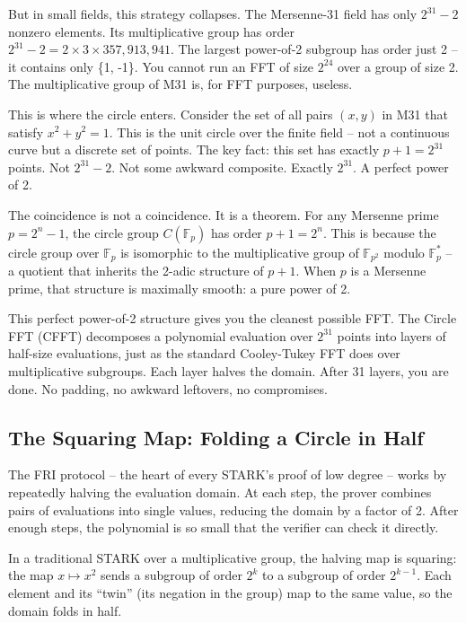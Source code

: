 \documentclass[
  11pt,
  openany]{report}
\begin{document}
But in small fields, this strategy collapses. The Mersenne-31 field has only
\(2^{31} - 2\) nonzero elements. Its multiplicative group has order
\(2^{31} - 2 = 2 \times 3 \times 357{,}913{,}941\). The largest power-of-2
subgroup has order just 2 -- it contains only \{1, -1\}. You cannot run an FFT
of size \(2^{24}\) over a group of size 2. The multiplicative group of M31 is,
for FFT purposes, useless.

This is where the circle enters. Consider the set of all pairs \((x, y)\) in M31
that satisfy \(x^2 + y^2 = 1\). This is the unit circle over the finite field --
not a continuous curve but a discrete set of points. The key fact: this set has
exactly \(p + 1 = 2^{31}\) points. Not \(2^{31} - 2\). Not some awkward
composite. Exactly \(2^{31}\). A perfect power of 2.

The coincidence is not a coincidence. It is a theorem. For any Mersenne prime
\(p = 2^n - 1\), the circle group \(C(\mathbb{F}_p)\) has order \(p + 1 = 2^n\).
This is because the circle group over \(\mathbb{F}_p\) is isomorphic to the
multiplicative group of \(\mathbb{F}_{p^2}\) modulo \(\mathbb{F}_p^*\) -- a
quotient that inherits the 2-adic structure of \(p + 1\). When \(p\) is a
Mersenne prime, that structure is maximally smooth: a pure power of 2.

This perfect power-of-2 structure gives you the cleanest possible FFT. The
Circle FFT (CFFT) decomposes a polynomial evaluation over \(2^{31}\) points into
layers of half-size evaluations, just as the standard Cooley-Tukey FFT does over
multiplicative subgroups. Each layer halves the domain. After 31 layers, you are
done. No padding, no awkward leftovers, no compromises.

\subsection{The Squaring Map: Folding a Circle in
Half}\label{the-squaring-map-folding-a-circle-in-half}

The FRI protocol -- the heart of every STARK's proof of low degree -- works by
repeatedly halving the evaluation domain. At each step, the prover combines
pairs of evaluations into single values, reducing the domain by a factor of 2.
After enough steps, the polynomial is so small that the verifier can check it
directly.

In a traditional STARK over a multiplicative group, the halving map is squaring:
the map \(x \mapsto x^2\) sends a subgroup of order \(2^k\) to a subgroup of
order \(2^{k-1}\). Each element and its ``twin'' (its negation in the group) map
to the same value, so the domain folds in half.
\end{document}
